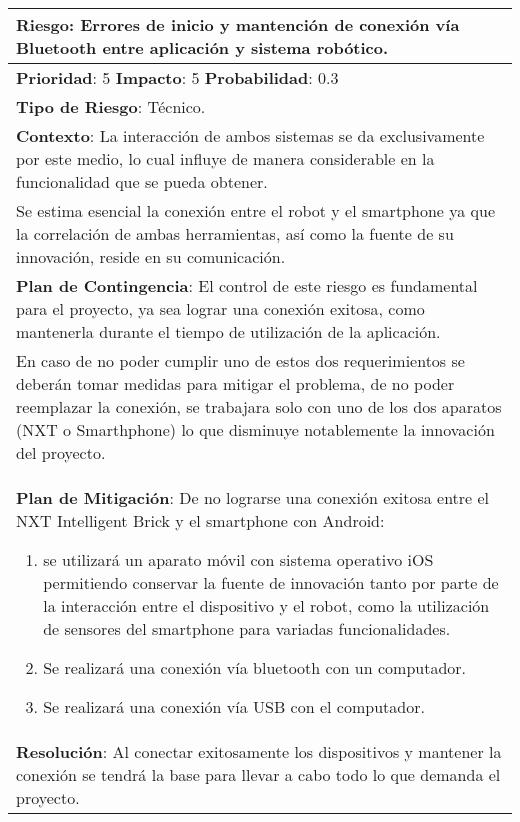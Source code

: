 \begin{table}[H]
  \centering
  \begin{tabular}{|p{15cm}|}\hline
    {\bf Riesgo}: Errores de inicio y mantención de conexión vía Bluetooth entre aplicación y sistema robótico.\\\hline
    {\bf Prioridad}: 5  {\bf Impacto}: 5  {\bf Probabilidad}: 0.3\\\hline
    {\bf Tipo de Riesgo}: Técnico.\\\hline
    {\bf Contexto}: La interacción de ambos sistemas se da exclusivamente por este medio, lo cual influye de manera considerable en la funcionalidad que se pueda obtener.\\Se estima esencial la conexión entre el robot y el smartphone ya que la correlación de ambas herramientas, así como la fuente de su innovación, reside en su comunicación.\\\hline
    {\bf Plan de Contingencia}: El control de este riesgo es fundamental para el proyecto, ya sea lograr una conexión exitosa, como mantenerla durante el tiempo de utilización de la aplicación.\\En caso de no poder cumplir uno de estos dos requerimientos se deberán tomar medidas para mitigar el problema, de no poder reemplazar la conexión, se trabajara solo con uno de los dos aparatos (NXT o Smarthphone) lo que disminuye notablemente la innovación del proyecto.\\\hline
    {\bf Plan de Mitigación}: De no lograrse una conexión exitosa entre el NXT Intelligent Brick y el smartphone con Android:\begin{enumerate}\item se utilizará un aparato móvil con sistema operativo iOS permitiendo conservar la fuente de innovación tanto por parte de la interacción entre el dispositivo y el robot, como la utilización de sensores del smartphone para variadas funcionalidades.\item Se realizará una conexión vía bluetooth con un computador.\item Se realizará una conexión vía USB con el computador.\end{enumerate}\\\hline
    {\bf Resolución}: Al conectar exitosamente los dispositivos y mantener la conexión se tendrá la base para llevar a cabo todo lo que demanda el proyecto.\\\hline
  \end{tabular}
  \label{table:R1}
\end{table}


